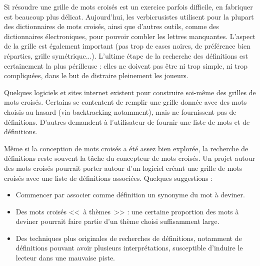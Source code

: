 \documentclass{article}
\begin{document}
Si résoudre une grille de mots croisés est un exercice parfois difficile, en fabriquer est beaucoup plus délicat. Aujourd'hui, les verbicrusistes utilisent pour la plupart des dictionnaires de mots croisés, ainsi que d'autres outils, comme des dictionnaires électroniques, pour pouvoir combler les lettres manquantes. L'aspect de la grille est également important (pas trop de cases noires, de préférence bien réparties, grille symétrique...). L'ultime étape de la recherche des définitions est certainement la plus périlleuse : elles ne doivent pas être ni trop simple, ni trop compliquées, dans le but de distraire pleinement les joueurs.

Quelques logiciels et sites internet existent pour construire soi-même des grilles de mots croisés. Certains se contentent de remplir une grille donnée avec des mots choisis au hasard (via backtracking notamment), mais ne fournissent pas de définitions. D'autres demandent à l'utilisateur de fournir une liste de mots et de définitions.

Même si la conception de mots croisés a été assez bien explorée, la recherche de définitions reste souvent la tâche du concepteur de mots croisés. Un projet autour des mots croisés pourrait porter autour d'un logiciel créant une grille de mots croisés avec une liste de définitions associées. Quelques suggestions :

\begin{itemize}
	\item Commencer par associer comme définition un synonyme du mot à deviner.
	\item Des mots croisés <<~à thèmes~>> : une certaine proportion des mots à deviner pourrait faire partie d'un thème choisi suffisamment large.
	\item Des techniques plus originales de recherches de définitions, notamment de définitions pouvant avoir plusieurs interprétations, susceptible d'induire le lecteur dans une mauvaise piste. %
\end{itemize}


\nocite{*}



\end{document}
